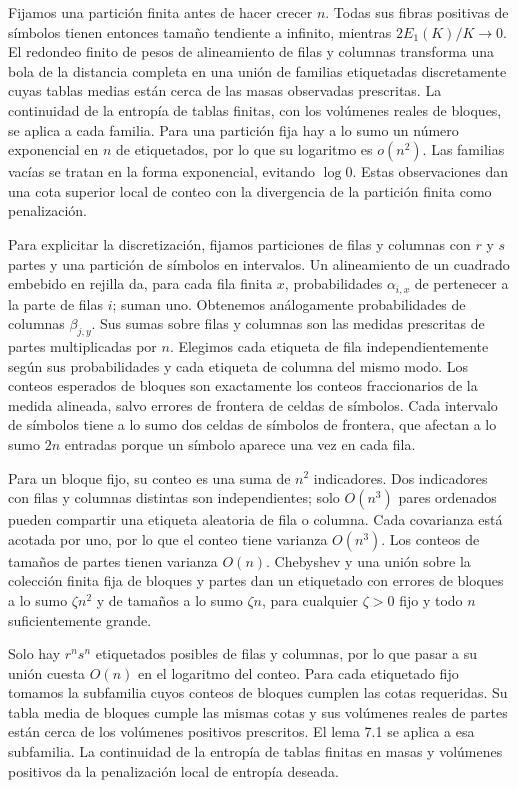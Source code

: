 \documentclass[spanish,11pt,a4paper]{article}
\begin{document}
Fijamos una partición finita antes de hacer crecer \(n\). Todas sus fibras positivas de símbolos tienen entonces tamaño tendiente a infinito, mientras \(2E_1(K)/K\to0\). El redondeo finito de pesos de alineamiento de filas y columnas transforma una bola de la distancia completa en una unión de familias etiquetadas discretamente cuyas tablas medias están cerca de las masas observadas prescritas. La continuidad de la entropía de tablas finitas, con los volúmenes reales de bloques, se aplica a cada familia. Para una partición fija hay a lo sumo un número exponencial en \(n\) de etiquetados, por lo que su logaritmo es \(o(n^2)\). Las familias vacías se tratan en la forma exponencial, evitando \(\log0\). Estas observaciones dan una cota superior local de conteo con la divergencia de la partición finita como penalización.

Para explicitar la discretización, fijamos particiones de filas y columnas con \(r\) y \(s\) partes y una partición de símbolos en intervalos. Un alineamiento de un cuadrado embebido en rejilla da, para cada fila finita \(x\), probabilidades \(\alpha_{i,x}\) de pertenecer a la parte de filas \(i\); suman uno. Obtenemos análogamente probabilidades de columnas \(\beta_{j,y}\). Sus sumas sobre filas y columnas son las medidas prescritas de partes multiplicadas por \(n\). Elegimos cada etiqueta de fila independientemente según sus probabilidades y cada etiqueta de columna del mismo modo. Los conteos esperados de bloques son exactamente los conteos fraccionarios de la medida alineada, salvo errores de frontera de celdas de símbolos. Cada intervalo de símbolos tiene a lo sumo dos celdas de símbolos de frontera, que afectan a lo sumo \(2n\) entradas porque un símbolo aparece una vez en cada fila.

Para un bloque fijo, su conteo es una suma de \(n^2\) indicadores. Dos indicadores con filas y columnas distintas son independientes; solo \(O(n^3)\) pares ordenados pueden compartir una etiqueta aleatoria de fila o columna. Cada covarianza está acotada por uno, por lo que el conteo tiene varianza \(O(n^3)\). Los conteos de tamaños de partes tienen varianza \(O(n)\). Chebyshev y una unión sobre la colección finita fija de bloques y partes dan un etiquetado con errores de bloques a lo sumo \(\zeta n^2\) y de tamaños a lo sumo \(\zeta n\), para cualquier \(\zeta>0\) fijo y todo \(n\) suficientemente grande.

Solo hay \(r^ns^n\) etiquetados posibles de filas y columnas, por lo que pasar a su unión cuesta \(O(n)\) en el logaritmo del conteo. Para cada etiquetado fijo tomamos la subfamilia cuyos conteos de bloques cumplen las cotas requeridas. Su tabla media de bloques cumple las mismas cotas y sus volúmenes reales de partes están cerca de los volúmenes positivos prescritos. El lema 7.1 se aplica a esa subfamilia. La continuidad de la entropía de tablas finitas en masas y volúmenes positivos da la penalización local de entropía deseada.
\end{document}
